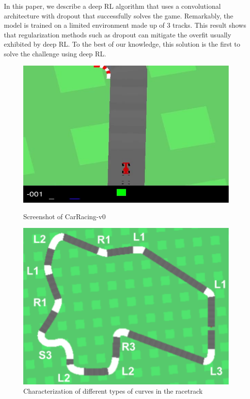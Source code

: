 \documentclass{article}
\begin{document}
In this paper, we describe a deep RL algorithm that uses a convolutional architecture with dropout that successfully solves the game. Remarkably, the model is trained on a limited environment made up of 3 tracks. This result shows that regularization methods such as dropout can mitigate the overfit usually exhibited by deep RL. To the best of our knowledge, this solution is the first to solve the challenge using deep RL.

\begin{figure}[!h]
\captionsetup{justification=centering}
\centering
\begin{minipage}{.4\textwidth}
  \centering
  \includegraphics[width=\linewidth]{Graphics/carracing.jpg}
  \caption{Screenshot of CarRacing-v0}
  \label{fig:carracing}
\end{minipage}
\hspace{1cm}
\begin{minipage}{.35\textwidth}
  \centering
  \includegraphics[width=\linewidth]{Graphics/curves.png}
  \caption{Characterization of different types of curves in the racetrack}
  \label{fig:curves}
\end{minipage}
\end{figure}
\end{document}

